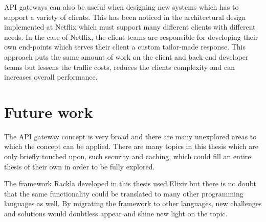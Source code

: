 \documentclass{cslthse-msc}
\begin{document}
API gateways can also be useful when designing new systems which has to support a variety of clients. This has been noticed in the architectural design implemented at Netflix\cite{netflix} which must support many different clients with different needs. In the case of Netflix, the client teams are responsible for developing their own end-points which serves their client a custom tailor-made response. This approach puts the same amount of work on the client and back-end developer teams but lessens the traffic costs, reduces the clients complexity and can increases overall performance.

\section{Future work}

The API gateway concept is very broad and there are many unexplored areas to which the concept can be applied. There are many topics in this thesis which are only briefly touched upon, such security and caching, which could fill an entire thesis of their own in order to be fully explored.

The framework Rackla developed in this thesis used Elixir but there is no doubt that the same functionality could be translated to many other programming languages as well. By migrating the framework to other languages, new challenges and solutions would doubtless appear and shine new light on the topic. 

\cleardoublepage
{}
{}


\end{document}
